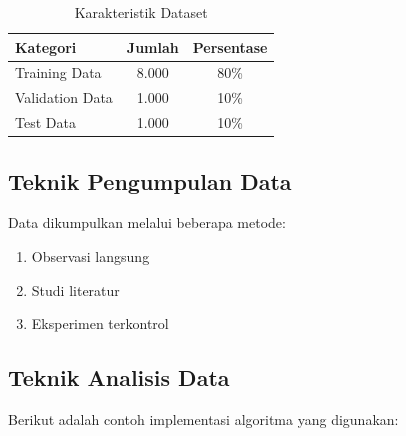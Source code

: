 \documentclass[11pt,a4paper]{article}
\begin{document}
\begin{table}[H]
\centering
\caption{Karakteristik Dataset}
\label{tab:dataset}
\begin{tabular}{@{}lcc@{}}
\toprule
\textbf{Kategori} & \textbf{Jumlah} & \textbf{Persentase} \\
\midrule
Training Data & 8.000 & 80\% \\
Validation Data & 1.000 & 10\% \\
Test Data & 1.000 & 10\% \\
\bottomrule
\end{tabular}
\end{table}

\subsection{Teknik Pengumpulan Data}
Data dikumpulkan melalui beberapa metode:
\begin{enumerate}
    \item Observasi langsung
    \item Studi literatur
    \item Eksperimen terkontrol
\end{enumerate}

\subsection{Teknik Analisis Data}
Berikut adalah contoh implementasi algoritma yang digunakan:
\end{document}
